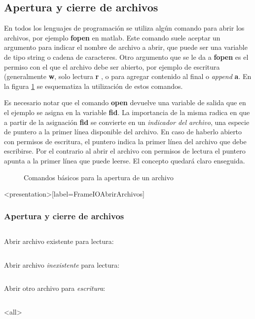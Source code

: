 \subsection{Apertura y cierre de archivos}
En todos los lenguajes de programación se utiliza algún comando
para abrir los archivos, por ejemplo \textbf{fopen} en matlab.
Este comando suele aceptar un argumento para indicar el
nombre de archivo a abrir, que puede ser una variable 
de tipo string o cadena de caracteres. Otro argumento
que se le da a \textbf{fopen} es el permiso con el 
que el archivo debe ser abierto, por ejemplo
de escritura (generalmente \textbf{w}, solo lectura \textbf{r}
, o para agregar contenido al final o \emph{append} \textbf{a}. 
En la figura \ref{FigIOAbrirArchivos} se esquematiza
la utilización de estos comandos. 

Es necesario notar que el comando \textbf{open} devuelve
una variable de salida que en el ejemplo se asigna 
en la variable \textbf{fid}. 
La importancia de la misma radica en que a partir
de la asignación \textbf{fid} se convierte en 
un \emph{indicador del archivo}, una especie de puntero
a la primer línea disponible del archivo. En caso
de haberlo abierto con permisos de escritura, 
el puntero indica la primer línea del 
archivo que debe escribirse. Por el contrario
al abrir el archivo con permisos de lectura
el puntero apunta a la primer
línea que puede leerse. El concepto quedará 
claro enseguida. 

\begin{figure}
\caption{Comandos básicos para la apertura de un archivo\label{FigIOAbrirArchivos}}
\end{figure}

\mode*

\begin{frame}<presentation>[label=FrameIOAbrirArchivos]
\frametitle{Apertura y cierre de archivos}

\begin{columns}[T]
\hfill Abrir archivo existente para lectura:
\begin{codeblock}

\end{codeblock}
\end{columns}

\begin{columns}[T]
\hfill Abrir archivo \emph{inexistente} para lectura:
\begin{codeblock}

\end{codeblock}
\end{columns}

\begin{columns}[T]
\hfill Abrir otro archivo  para \emph{escritura}:
\begin{codeblock}

\end{codeblock}
\end{columns}

\end{frame}

\mode<all>
